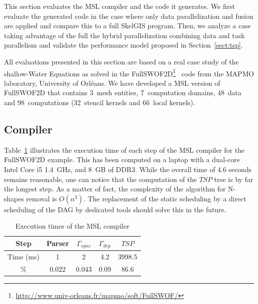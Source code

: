 
This section evaluates the MSL compiler and the code it generates.
We first evaluate the generated code in the case where only data parallelization and fusion are applied and compare this to a full SkelGIS program.
Then, we analyze a case taking advantage of the full the hybrid parallelization combining data and task parallelism and validate the performance model proposed in Section~\ref{sect:tsp}.

All evaluations presented in this section are based on a real case study of the shallow-Water Equations as solved in  the FullSWOF2D\footnote{\url{http://www.univ-orleans.fr/mapmo/soft/FullSWOF/}}~\cite{Ferrari2004,CPE:CPE3494} code from the MAPMO laboratory, University of Orl\'eans.
We have developed a MSL version of FullSWOF2D that contains 3~mesh entities, 7~computation domains, 48~data and 98~computations (32~stencil kernels and 66~local kernels).

\subsection{Compiler}

Table~\ref{fig:exectime} illustrates the execution time of each step of the MSL compiler for the FullSWOF2D example.
This has been computed on a laptop with a dual-core Intel Core i5 1.4~GHz, and 8~GB of DDR3.
While the overall time of 4.6 seconds remains reasonable, one can notice that the computation of the $TSP$ tree is by far the longest step.
As a matter of fact, the complexity of the algorithm for N-shapes removal is $O(n^3)$.
The replacement of the static scheduling by a direct scheduling of the DAG by dedicated tools should solve this in the future.

\begin{table}[!h]
 \begin{center}
 \begin{tabular}{|c|c|c|c|c|}
  \hline
   Step & Parser & $\Gamma_{sync}$ & $\Gamma_{dep}$ & $TSP$\\
   \hline
   Time (ms) & 1 & 2 & 4.2 & 3998.5\\
   \hline
   \% & 0.022 & 0.043 & 0.09 & 86.6\\
   \hline
 \end{tabular}
\caption{Execution times of the MSL compiler}
\label{fig:exectime}
 \end{center}
\end{table}

